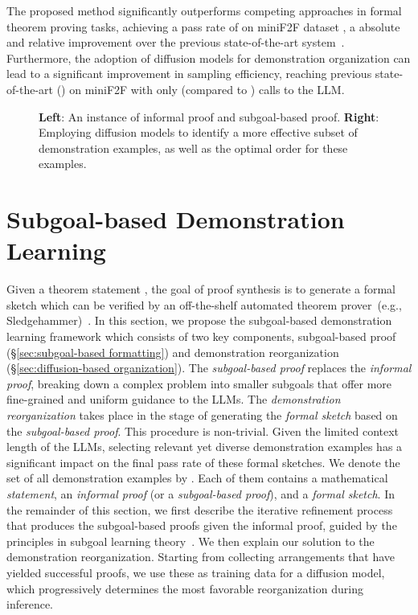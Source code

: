 \documentclass{article}
\begin{document}
The proposed method significantly outperforms competing approaches in formal theorem proving tasks, achieving a pass rate of  on miniF2F dataset \cite{zheng2021minif2f}, a  absolute and  relative improvement over the previous state-of-the-art system~\cite{jiang2022draft}. Furthermore, the adoption of diffusion models for demonstration organization can lead to a significant improvement in sampling efficiency, reaching previous state-of-the-art () on miniF2F with only  (compared to ) calls to the LLM.


\begin{figure*}
\centering
{}
\vspace{-2mm}
\caption{\textbf{Left}: An instance of informal proof and subgoal-based proof. \textbf{Right}: Employing diffusion models to identify a more effective subset of demonstration examples, as well as the optimal order for these examples.}
\end{figure*}



\section{Subgoal-based Demonstration Learning}
\label{sec:method}
Given a theorem statement , the goal of proof synthesis is to generate a formal sketch  which can be verified by an off-the-shelf automated theorem prover~(e.g., Sledgehammer)~\cite{jiang2022draft}. In this section, we propose the subgoal-based demonstration learning framework which consists of two key components, subgoal-based proof (\S\ref{sec:subgoal-based formatting}) and demonstration reorganization (\S\ref{sec:diffusion-based organization}). The \emph{subgoal-based proof} replaces the \emph{informal proof}, breaking down a complex problem into smaller subgoals that offer more fine-grained and uniform guidance to the LLMs. The \emph{demonstration reorganization} takes place in the stage of generating the \emph{formal sketch} based on the \emph{subgoal-based proof}. This procedure is non-trivial. Given the limited context length of the LLMs, selecting relevant yet diverse demonstration examples has a significant impact on the final pass rate of these formal sketches. 
We denote the set of all  demonstration examples by . Each of them contains a mathematical \emph{statement}, an \emph{informal proof} (or a \emph{subgoal-based proof}), and a \emph{formal sketch}. In the remainder of this section, we first describe the iterative refinement process that produces the subgoal-based proofs given the informal proof, guided by the principles in subgoal learning theory~\cite{zhang2021c}. We then explain our solution to the demonstration reorganization. Starting from collecting arrangements that have yielded successful proofs, we use these as training data for a diffusion model, which progressively determines the most favorable reorganization during inference.
\end{document}
